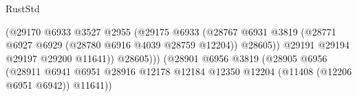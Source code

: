 \begin{lexlean}{RustStd}
\begin{coremodule}
                                                          (@29170
                                                            @6933
                                                            @3527
                                                            @2955
                                                            (@29175
                                                              @6933
                                                              (@28767
                                                                @6931
                                                                @3819
                                                                (@28771
                                                                  @6927
                                                                  @6929
                                                                  (@28780
                                                                    @6916
                                                                    @4039
                                                                    @28759
                                                                    @12204))
                                                                @28605))
                                                            @29191
                                                            @29194
                                                            @29197
                                                            @29200
                                                            @11641))
                                                        @28605)))
                                                  (@28901
                                                    @6956
                                                    @3819
                                                    (@28905
                                                      @6956
                                                      (@28911
                                                        @6941
                                                        @6951
                                                        @28916
                                                        @12178
                                                        @12184
                                                        @12350
                                                        @12204
                                                        (@11408 (@12206 @6951 @6942))
                                                        @11641))

\end{coremodule}
\end{lexlean}
